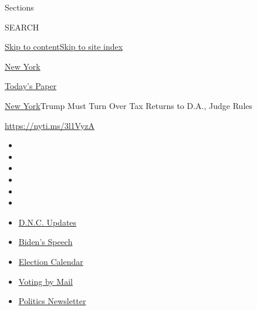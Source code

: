 Sections

SEARCH

\protect\hyperlink{site-content}{Skip to
content}\protect\hyperlink{site-index}{Skip to site index}

\href{https://www.nytimes3xbfgragh.onion/section/nyregion}{New York}

\href{https://myaccount.nytimes3xbfgragh.onion/auth/login?response_type=cookie\&client_id=vi}{}

\href{https://www.nytimes3xbfgragh.onion/section/todayspaper}{Today's
Paper}

\href{/section/nyregion}{New York}\textbar{}Trump Must Turn Over Tax
Returns to D.A., Judge Rules

\url{https://nyti.ms/3l1VyzA}

\begin{itemize}
\item
\item
\item
\item
\item
\item
\end{itemize}

\begin{itemize}
\item
  \href{https://www.nytimes3xbfgragh.onion/live/2020/08/20/us/dnc-convention-election?action=click\&pgtype=Article\&state=default\&region=TOP_BANNER\&context=storylines_menu}{D.N.C.
  Updates}
\item
  \href{https://www.nytimes3xbfgragh.onion/2020/08/20/us/politics/biden-presidential-nomination-dnc.html?action=click\&pgtype=Article\&state=default\&region=TOP_BANNER\&context=storylines_menu}{Biden's
  Speech}
\item
  \href{https://www.nytimes3xbfgragh.onion/interactive/2019/us/elections/2020-presidential-election-calendar.html?action=click\&pgtype=Article\&state=default\&region=TOP_BANNER\&context=storylines_menu}{Election
  Calendar}
\item
  \href{https://www.nytimes3xbfgragh.onion/interactive/2020/08/11/us/politics/vote-by-mail-us-states.html?action=click\&pgtype=Article\&state=default\&region=TOP_BANNER\&context=storylines_menu}{Voting
  by Mail}
\item
  \href{https://www.nytimes3xbfgragh.onion/newsletters/politics?action=click\&pgtype=Article\&state=default\&region=TOP_BANNER\&context=storylines_menu}{Politics
  Newsletter}
\end{itemize}

